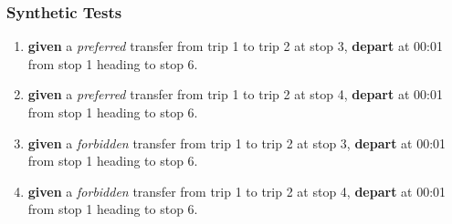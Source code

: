 \documentclass[a4paper,11pt]{article}
\begin{document}
\begin{enumerate}
\begin{enumerate}
\subsubsection*{Synthetic Tests}
\begin{enumerate}
\item \textbf{given} a \textit{preferred} transfer from trip 1 to trip 2 at stop 3, \textbf{depart} at 00:01 from stop 1 heading to stop 6.
\item \textbf{given} a \textit{preferred} transfer from trip 1 to trip 2 at stop 4, \textbf{depart} at 00:01 from stop 1 heading to stop 6.
\item \textbf{given} a \textit{forbidden} transfer from trip 1 to trip 2 at stop 3, \textbf{depart} at 00:01 from stop 1 heading to stop 6.
\item \textbf{given} a \textit{forbidden} transfer from trip 1 to trip 2 at stop 4, \textbf{depart} at 00:01 from stop 1 heading to stop 6.
\end{enumerate}

\newpage


\end{enumerate}
\end{enumerate}
\end{document}
